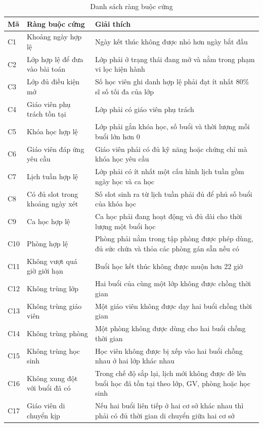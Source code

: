 \documentclass[../DoAn.tex]{subfiles}
\begin{document}
\begin{table}[H]
\centering
\caption{Danh sách ràng buộc cứng}
\label{table:bang5.2}
\scriptsize
\begin{tabular}{|l|p{4cm}|p{6.5cm}|}
\hline
\textbf{Mã} & \textbf{Ràng buộc cứng} & \textbf{Giải thích} \\ \hline
C1 & Khoảng ngày hợp lệ & Ngày kết thúc không được nhỏ hơn ngày bắt đầu \\ \hline
C2 & Lớp hợp lệ để đưa vào bài toán & Lớp phải ở trạng thái đang mở và nằm trong phạm vi lọc hiện hành \\ \hline
C3 & Lớp đủ điều kiện mở & Số học viên ghi danh hợp lệ phải đạt ít nhất 80\% sĩ số tối đa của lớp \\ \hline
C4 & Giáo viên phụ trách tồn tại & Lớp phải có giáo viên phụ trách \\ \hline
C5 & Khóa học hợp lệ & Lớp phải gắn khóa học, số buổi và thời lượng mỗi buổi lớn hơn 0 \\ \hline
C6 & Giáo viên đáp ứng yêu cầu & Giáo viên phải có đủ kỹ năng hoặc chứng chỉ mà khóa học yêu cầu \\ \hline
C7 & Lịch tuần hợp lệ & Lớp phải có ít nhất một cấu hình lịch tuần gồm ngày học và ca học \\ \hline
C8 & Có đủ slot trong khoảng ngày xét & Số slot sinh ra từ lịch tuần phải đủ để phủ số buổi của khóa học \\ \hline
C9 & Ca học hợp lệ & Ca học phải đang hoạt động và đủ dài cho thời lượng một buổi học \\ \hline
C10 & Phòng hợp lệ & Phòng phải nằm trong tập phòng được phép dùng, đủ sức chứa và thỏa các phòng gán sẵn nếu có \\ \hline
C11 & Không vượt quá giờ giới hạn & Buổi học kết thúc không được muộn hơn 22 giờ \\ \hline
C12 & Không trùng lớp & Hai buổi của cùng một lớp không được chồng thời gian \\ \hline
C13 & Không trùng giáo viên & Một giáo viên không được dạy hai buổi chồng thời gian \\ \hline
C14 & Không trùng phòng & Một phòng không được dùng cho hai buổi chồng thời gian \\ \hline
C15 & Không trùng học sinh & Học viên không được bị xếp vào hai buổi chồng nhau ở hai lớp khác nhau \\ \hline
C16 & Không xung đột với buổi đã có & Trong chế độ sắp lại, lịch mới không được đè lên buổi học đã tồn tại theo lớp, GV, phòng hoặc học sinh \\ \hline
C17 & Giáo viên di chuyển kịp & Nếu hai buổi liên tiếp ở hai cơ sở khác nhau thì phải có đủ thời gian di chuyển giữa hai cơ sở \\ \hline
\end{tabular}
\end{table}
\end{document}
